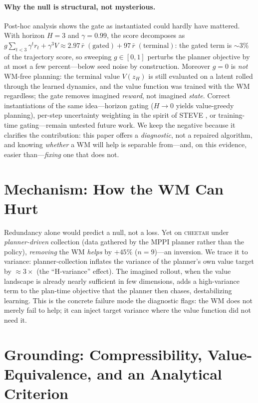 \documentclass[twocolumn,10pt]{article}
\begin{document}
\paragraph{Why the null is structural, not mysterious.}
Post-hoc analysis shows the gate as instantiated could hardly have mattered.
With horizon $H{=}3$ and $\gamma{=}0.99$, the score decomposes as
$g\sum_{t<3}\gamma^t r_t + \gamma^3 V \approx 2.97\,\bar r\;(\text{gated}) +
97\,\bar r\;(\text{terminal})$: the gated term is $\sim$3\% of the trajectory
score, so sweeping $g\in[0,1]$ perturbs the planner objective by at most a few
percent---below seed noise by construction. Moreover $g{=}0$ is \emph{not}
WM-free planning: the terminal value $V(z_H)$ is still evaluated on a latent
rolled through the learned dynamics, and the value function was trained with
the WM regardless; the gate removes imagined \emph{reward}, not imagined
\emph{state}. Correct instantiations of the same idea---horizon gating
($H\!\to\!0$ yields value-greedy planning), per-step uncertainty weighting in
the spirit of STEVE \cite{buckman2018steve}, or training-time gating---remain
untested future work. We keep the negative because it clarifies the
contribution: this paper offers a \emph{diagnostic}, not a repaired algorithm,
and knowing \emph{whether} a WM will help is separable from---and, on this
evidence, easier than---\emph{fixing} one that does not.

\section{Mechanism: How the WM Can Hurt}
\label{sec:mechanism}
Redundancy alone would predict a null, not a loss. Yet on \textsc{cheetah}
under \emph{planner-driven} collection (data gathered by the MPPI planner
rather than the policy), \emph{removing} the WM \emph{helps} by $+45\%$
($n{=}9$)---an inversion. We trace it to variance: planner-collection inflates
the variance of the planner's own value target by $\approx 3\times$ (the
``H-variance'' effect). The imagined rollout, when the value landscape is
already nearly sufficient in few dimensions, adds a high-variance term to the
plan-time objective that the planner then chases, destabilizing learning.
This is the concrete failure mode the diagnostic flags: the WM does not merely
fail to help; it can inject target variance where the value function did not
need it.

\section{Grounding: Compressibility, Value-Equivalence, and an Analytical Criterion}
\label{sec:theory}
\end{document}
